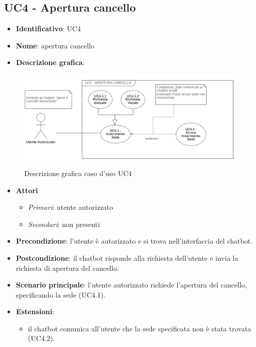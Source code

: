 \subsection{UC4 - Apertura cancello}
\begin{itemize}
    \item \textbf{Identificativo}: UC4
    \item \textbf{Nome}: apertura cancello
    \item \textbf{Descrizione grafica}:
\end{itemize}

\begin{figure}[h]
   \centering
   \includegraphics[scale=1.5]{images/UC4.png} 
   \caption{Descrizione grafica caso d'uso UC4}
\end{figure}


 \begin{itemize}
    \item \textbf{Attori}
 \begin{itemize} 
    \item \textit{Primari}: utente autorizzato
    \item \textit{Secondari}: non presenti
 \end{itemize}
 \item \textbf{Precondizione}: l'utente è autorizzato e si trova nell'interfaccia del chatbot.
 \item \textbf{Postcondizione}: il chatbot risponde alla richiesta dell'utente e invia la richiesta di apertura del cancello.
 \item \textbf{Scenario principale}: l'utente autorizzato richiede l'apertura del cancello, specificando la sede (UC4.1).
 \item \textbf{Estensioni}: 
 \begin{itemize} 
    \item il chatbot comunica all'utente che la sede specificata non è stata trovata (UC4.2).
 \end{itemize}
\end{itemize}
\newpage
